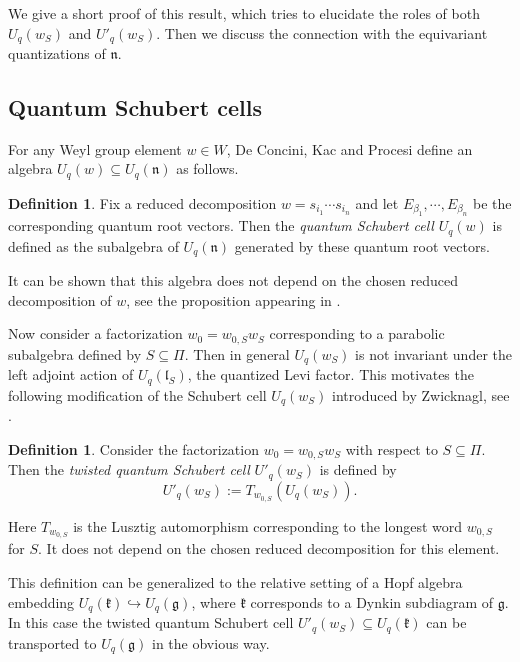 \documentclass[a4paper, 12pt, reqno, english]{amsart}
\numberwithin{equation}{section}
\numberwithin{figure}{section}
\theoremstyle{plain}
\theoremstyle{plain}
\theoremstyle{plain}
\theoremstyle{plain}
\theoremstyle{plain}
\theoremstyle{definition}
\newtheorem{definition}[theorem]{Definition}
\theoremstyle{definition}
\theoremstyle{definition}
\theoremstyle{remark}
\theoremstyle{definition}
\theoremstyle{definition}
\newcommand{\Uqg}{U_q(\mathfrak{g})}
\newcommand{\Uqk}{U_q(\mathfrak{k})}
\newcommand{\Uqn}{U_q(\mathfrak{n})}
\newcommand{\UqlS}{U_q(\mathfrak{l}_S)}
\newcommand{\lieg}{\mathfrak{g}}
\newcommand{\liek}{\mathfrak{k}}
\newcommand{\lien}{\mathfrak{n}}
\newcommand{\schub}{U_q}
\newcommand{\tschub}{U'_q}
\newcommand{\simpleroots}{\Pi}
\begin{document}
We give a short proof of this result, which tries to elucidate the roles of both $\schub(w_S)$ and $\tschub(w_S)$.
Then we discuss the connection with the equivariant quantizations of $\lien$.

\subsection{Quantum Schubert cells}

For any Weyl group element $w \in W$, De Concini, Kac and Procesi define an algebra $\schub(w) \subseteq \Uqn$ as follows.

\begin{definition}
Fix a reduced decomposition $w = s_{i_1} \cdots s_{i_n}$ and let $E_{\beta_1}, \cdots, E_{\beta_n}$ be the corresponding quantum root vectors.
Then the \emph{quantum Schubert cell} $\schub(w)$ is defined as the subalgebra of $\Uqn$ generated by these quantum root vectors.
\end{definition}

It can be shown that this algebra does not depend on the chosen reduced decomposition of $w$, see the proposition appearing in \cite[Section 2.2]{dckp}.

Now consider a factorization $w_0 = w_{0, S} w_S$ corresponding to a parabolic subalgebra defined by $S \subseteq \simpleroots$. Then in general $\schub(w_S)$ is not invariant under the left adjoint action of $\UqlS$, the quantized Levi factor.
This motivates the following modification of the Schubert cell $\schub(w_S)$ introduced by Zwicknagl, see \cite[Definition 5.4]{zwicknagl}.

\begin{definition}
Consider the factorization $w_0 = w_{0, S} w_S$ with respect to $S \subseteq \simpleroots$.
Then the \emph{twisted quantum Schubert cell} $\tschub(w_S)$ is defined by
\[
\tschub(w_S) := T_{w_{0, S}}(\schub(w_S)).
\]
\end{definition}

Here $T_{w_{0, S}}$ is the Lusztig automorphism corresponding to the longest word $w_{0, S}$ for $S$.
It does not depend on the chosen reduced decomposition for this element.

This definition can be generalized to the relative setting of a Hopf algebra embedding $\Uqk \hookrightarrow \Uqg$, where $\liek$ corresponds to a Dynkin subdiagram of $\lieg$.
In this case the twisted quantum Schubert cell $\tschub(w_S) \subseteq \Uqk$ can be transported to $\Uqg$ in the obvious way.
\end{document}
